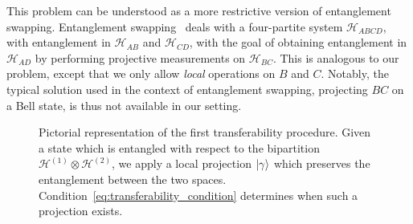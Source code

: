 \documentclass[
	aps, pra,
	superscriptaddress, twocolumn,
	floatfix,
	10pt
]{revtex4-1}
\newcommand{\on}[1]{\operatorname{#1}}
\newcommand{\parTitle}[1]{\noindent{\color{Mahogany}(\emph{#1})}}
\newcommand{\calH}{{\mathcal{H}}}
\newcommand{\calW}{{\mathcal{W}}}
\newcommand{\LI}[1]{\highlight{(LI: \textit{#1})}}
\renewcommand{\parTitle}[1]{}
\begin{document}

\parTitle{Relations with entanglement swapping}
This problem can be understood as a more restrictive version of entanglement swapping.
Entanglement swapping~\cite{zukowski1993eventreadydetectors} deals with a four-partite system $\calH_{ABCD}$, with entanglement in $\calH_{AB}$ and $\calH_{CD}$, with the goal of obtaining entanglement in $\calH_{AD}$ by performing projective measurements on $\calH_{BC}$.
This is analogous to our problem, except that we only allow \emph{local} operations on $B$ and $C$. Notably, the typical solution used in the context of entanglement swapping, projecting $BC$ on a Bell state, is thus not available in our setting.

\begin{figure}
    \centering
    
    \caption{Pictorial representation of the first transferability procedure.
    Given a state which is entangled with respect to the bipartition $\calH^{(1)}\otimes\calH^{(2)}$, we apply a local projection $\ket\gamma$ which preserves the entanglement between the two spaces.
    Condition~\eqref{eq:transferability_condition} determines when such a projection exists.
    }
    \label{fig:TC1_general_condition_scheme}
\end{figure}
\end{document}

